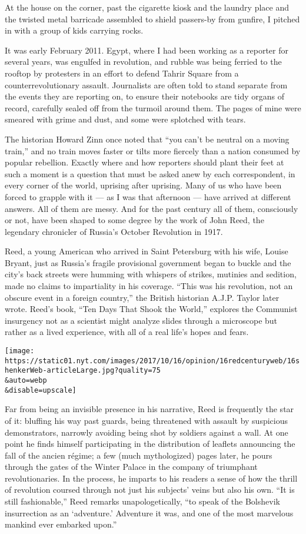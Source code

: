 At the house on the corner, past the cigarette kiosk and the laundry
place and the twisted metal barricade assembled to shield passers-by
from gunfire, I pitched in with a group of kids carrying rocks.

It was early February 2011. Egypt, where I had been working as a
reporter for several years, was engulfed in revolution, and rubble was
being ferried to the rooftop by protesters in an effort to defend Tahrir
Square from a counterrevolutionary assault. Journalists are often told
to stand separate from the events they are reporting on, to ensure their
notebooks are tidy organs of record, carefully sealed off from the
turmoil around them. The pages of mine were smeared with grime and dust,
and some were splotched with tears.

The historian Howard Zinn once noted that ``you can't be neutral on a
moving train,'' and no train moves faster or tilts more fiercely than a
nation consumed by popular rebellion. Exactly where and how reporters
should plant their feet at such a moment is a question that must be
asked anew by each correspondent, in every corner of the world, uprising
after uprising. Many of us who have been forced to grapple with it ---
as I was that afternoon --- have arrived at different answers. All of
them are messy. And for the past century all of them, consciously or
not, have been shaped to some degree by the work of John Reed, the
legendary chronicler of Russia's October Revolution in 1917.

Reed, a young American who arrived in Saint Petersburg with his wife,
Louise Bryant, just as Russia's fragile provisional government began to
buckle and the city's back streets were humming with whispers of
strikes, mutinies and sedition, made no claims to impartiality in his
coverage. ``This was his revolution, not an obscure event in a foreign
country,'' the British historian A.J.P. Taylor later wrote. Reed's book,
``Ten Days That Shook the World,'' explores the Communist insurgency not
as a scientist might analyze slides through a microscope but rather as a
lived experience, with all of a real life's hopes and fears.

\texttt{[image: https://static01.nyt.com/images/2017/10/16/opinion/16redcenturyweb/16shenkerWeb-articleLarge.jpg?quality=75\\\&auto=webp\\\&disable=upscale]}

Far from being an invisible presence in his narrative, Reed is
frequently the star of it: bluffing his way past guards, being
threatened with assault by suspicious demonstrators, narrowly avoiding
being shot by soldiers against a wall. At one point he finds himself
participating in the distribution of leaflets announcing the fall of the
ancien régime; a few (much mythologized) pages later, he pours through
the gates of the Winter Palace in the company of triumphant
revolutionaries. In the process, he imparts to his readers a sense of
how the thrill of revolution coursed through not just his subjects'
veins but also his own. ``It is still fashionable,'' Reed remarks
unapologetically, ``to speak of the Bolshevik insurrection as an
`adventure.' Adventure it was, and one of the most marvelous mankind
ever embarked upon.''

